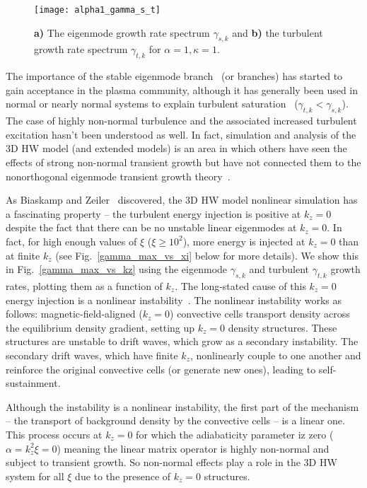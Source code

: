 \documentclass[twocolumn,showkeys,superscriptaddress]{revtex4}
\begin{document}
\begin{figure}
\centerline{\texttt{[image: alpha1\_gamma\_s\_t]}}
\caption{{\bf a)} The eigenmode growth rate spectrum $\gamma_{s,k}$ and {\bf b)} the turbulent growth rate spectrum $\gamma_{t,k}$ for $\alpha = 1, \kappa=1$.}
\label{alpha1_gamma_s_t}
\end{figure}

The importance of the stable eigenmode branch~\cite{baver2002} (or branches) has started to gain acceptance in the plasma community, although it has generally been used in normal
or nearly normal systems to explain turbulent saturation~\cite{terry2006b,hatch2011,makwana2011} ($\gamma_{t,k} < \gamma_{s,k}$). 
The case of highly non-normal turbulence and the associated increased turbulent excitation hasn't been understood as well. 
In fact, simulation and analysis of the 3D HW model (and extended models) is an area in which others have seen the effects of strong non-normal transient growth
but have not connected them to the nonorthogonal eigenmode transient growth theory~\cite{biskamp1995,drake1995,scott2002,scott2005,umansky2009,friedman2012b}.

As Biaskamp and Zeiler~\cite{biskamp1995} discovered, the 3D HW model nonlinear simulation has a fascinating property -- 
the turbulent energy injection is positive at $k_z = 0$ despite the fact that there can be no unstable linear eigenmodes at $k_z=0$.
In fact, for high enough values of $\xi$ ($\xi \ge 10^2$), more energy is injected at $k_z = 0$ than at finite $k_z$ (see Fig.~\ref{gamma_max_vs_xi} below for more details).
We show this in Fig.~\ref{gamma_max_vs_kz} using the eigenmode $\gamma_{s,k}$ and turbulent $\gamma_{t,k}$ growth rates, plotting them as a function of $k_z$.
The long-stated cause of this $k_z=0$ energy injection is a nonlinear instability~\cite{biskamp1995,drake1995}. 
The nonlinear instability works as follows: magnetic-field-aligned ($k_z=0$) convective cells transport density across the equilibrium density gradient, setting up $k_z=0$ density structures. 
These structures are unstable to drift waves, which grow as a secondary instability.
The secondary drift waves, which have finite $k_z$, nonlinearly couple to one another and reinforce the original convective cells (or generate new ones), leading to self-sustainment.

Although the instability is a nonlinear instability, the first part of the mechanism -- the transport of background density by the convective cells -- is a linear one. This process occurs at $k_z=0$
for which the adiabaticity parameter iz zero ($\alpha = k_z^2 \xi = 0$) meaning the linear matrix operator is highly non-normal and subject to transient growth.
So non-normal effects play a role in the 3D HW system for all $\xi$ due to the presence of $k_z=0$ structures.
\end{document}
